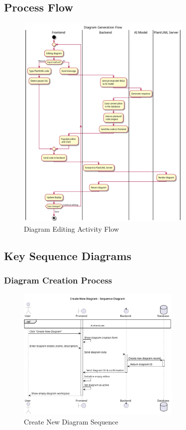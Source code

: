 \subsection{Process Flow}
\begin{figure}[H]
\centering
\includegraphics[width=0.75\textwidth]{conception/SprintIV/Activity_diagrams/edit_diagams.png}
\caption{Diagram Editing Activity Flow}
\end{figure}

\subsection{Key Sequence Diagrams}

\subsubsection{Diagram Creation Process}
\begin{figure}[H]
\centering
\includegraphics[width=0.7\textwidth]{conception/SprintIV/sequence_diagrams/sequence_diagramManagement_4_1_CreateNewDiagram.png}
\caption{Create New Diagram Sequence}
\end{figure}

